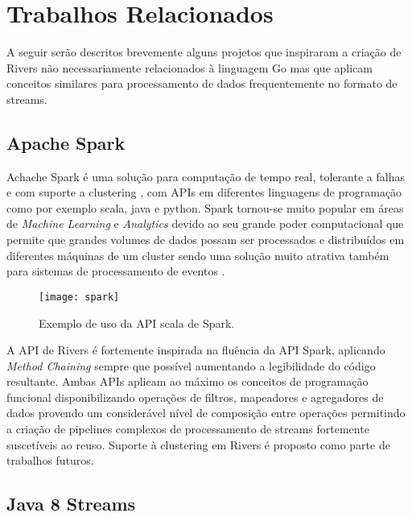 \chapter{Trabalhos Relacionados}
\label{cha:related_work}

A seguir serão descritos brevemente alguns projetos que inspiraram a criação de Rivers não necessariamente relacionados à linguagem Go mas que aplicam conceitos similares para processamento de dados frequentemente no formato de streams.

\section{Apache Spark}
\label{sec:apache_spark}

Achache Spark \cite{docs:apache:spark} é uma solução para computação de tempo real, tolerante a falhas e com suporte a clustering \cite{article:kris:clustering}, com APIs em diferentes linguagens de programação como por exemplo scala, java e python. Spark tornou-se muito popular em áreas de \emph{Machine Learning} \cite{course:coursera:ml} e \emph{Analytics} \cite{article:techtarget:analytics} devido ao seu grande poder computacional que permite que grandes volumes de dados possam ser processados e distribuídos em diferentes máquinas de um cluster sendo uma solução muito atrativa também para sistemas de processamento de eventos \cite{docs:apache:streaming}.

\begin{figure}[H]
  \texttt{[image: spark]}
  \centering
  \caption{Exemplo de uso da API scala de Spark.}
  \label{code:apache:spark}
\end{figure}

A API de Rivers é fortemente inspirada na fluência da API Spark, aplicando \emph{Method Chaining} \cite{article:sitepoint:method_chaining} sempre que possível aumentando a legibilidade do código resultante. Ambas APIs aplicam ao máximo os conceitos de programação funcional disponibilizando operações de filtros, mapeadores e agregadores de dados provendo um considerável nível de composição entre operações permitindo a criação de pipelines complexos de processamento de streams fortemente suscetíveis ao reuso. Suporte à clustering em Rivers é proposto como parte de trabalhos futuros.

\section{Java 8 Streams}
\label{sec:java8_streams}

